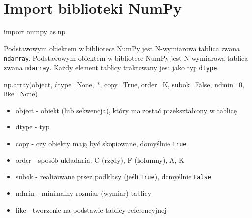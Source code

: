 \documentclass[
  polish,
  letterpaper,
  DIV=11,
  numbers=noendperiod]{scrreprt}
\newenvironment{Shaded}{\begin{snugshade}}{\end{snugshade}}
\newcommand{\BuiltInTok}[1]{\textcolor[rgb]{0.00,0.23,0.31}{#1}}
\newcommand{\DecValTok}[1]{\textcolor[rgb]{0.68,0.00,0.00}{#1}}
\newcommand{\ImportTok}[1]{\textcolor[rgb]{0.00,0.46,0.62}{#1}}
\newcommand{\NormalTok}[1]{\textcolor[rgb]{0.00,0.23,0.31}{#1}}
\newcommand{\OperatorTok}[1]{\textcolor[rgb]{0.37,0.37,0.37}{#1}}
\newcommand{\StringTok}[1]{\textcolor[rgb]{0.13,0.47,0.30}{#1}}
\newcommand{\VariableTok}[1]{\textcolor[rgb]{0.07,0.07,0.07}{#1}}
\providecommand{\tightlist}{%
  \setlength{\itemsep}{0pt}\setlength{\parskip}{0pt}}
\begin{document}
\section{Import biblioteki NumPy}\label{import-biblioteki-numpy}

\begin{Shaded}
\begin{Highlighting}[]
\ImportTok{import}\NormalTok{ numpy }\ImportTok{as}\NormalTok{ np}
\end{Highlighting}
\end{Shaded}

Podstawowym obiektem w bibliotece NumPy jest N-wymiarowa tablica zwana
\texttt{ndarray}. Podstawowym obiektem w bibliotece NumPy jest
N-wymiarowa tablica zwana \texttt{ndarray}. Każdy element tablicy
traktowany jest jako typ \texttt{dtype}.

\begin{Shaded}
\begin{Highlighting}[]
\NormalTok{np.array(}\BuiltInTok{object}\NormalTok{, dtype}\OperatorTok{=}\VariableTok{None}\NormalTok{, }\OperatorTok{*}\NormalTok{, copy}\OperatorTok{=}\VariableTok{True}\NormalTok{, order}\OperatorTok{=}\StringTok{\textquotesingle{}K\textquotesingle{}}\NormalTok{, subok}\OperatorTok{=}\VariableTok{False}\NormalTok{, ndmin}\OperatorTok{=}\DecValTok{0}\NormalTok{, like}\OperatorTok{=}\VariableTok{None}\NormalTok{)}
\end{Highlighting}
\end{Shaded}

\begin{itemize}
\tightlist
\item
  object - obiekt (lub sekwencja), który ma zostać przekształcony w
  tablicę
\item
  dtype - typ
\item
  copy - czy obiekty mają być skopiowane, domyślnie \texttt{True}
\item
  order - sposób układania: C (rzędy), F (kolumny), A, K
\item
  subok - realizowane przez podklasy (jeśli \texttt{True}), domyślnie
  \texttt{False}
\item
  ndmin - minimalny rozmiar (wymiar) tablicy
\item
  like - tworzenie na podstawie tablicy referencyjnej
\end{itemize}
\end{document}
